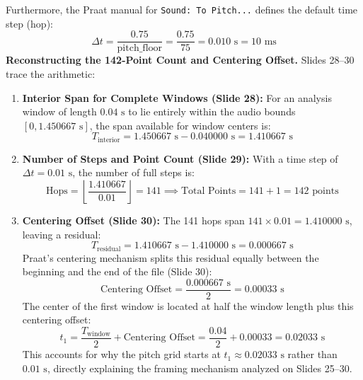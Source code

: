 \documentclass[11pt,a4paper]{article}
\begin{document}
Furthermore, the Praat manual for \texttt{Sound: To Pitch...} defines the default time step (hop):
\begin{equation}
\Delta t = \frac{0.75}{\text{pitch\_floor}} = \frac{0.75}{75} = 0.010\text{ s} = 10\text{ ms}
\end{equation}
\textbf{Reconstructing the 142-Point Count and Centering Offset.} Slides 28--30 trace the arithmetic:
\begin{enumerate}
    \item \textbf{Interior Span for Complete Windows (Slide 28):} For an analysis window of length $0.04\text{ s}$ to lie entirely within the audio bounds $[0, 1.450667\text{ s}]$, the span available for window centers is:
    \begin{equation}
    T_{\text{interior}} = 1.450667\text{ s} - 0.040000\text{ s} = 1.410667\text{ s}
    \end{equation}
    \item \textbf{Number of Steps and Point Count (Slide 29):} With a time step of $\Delta t = 0.01\text{ s}$, the number of full steps is:
    \begin{equation}
    \text{Hops} = \left\lfloor \frac{1.410667}{0.01} \right\rfloor = 141 \implies \text{Total Points} = 141 + 1 = 142\text{ points}
    \end{equation}
    \item \textbf{Centering Offset (Slide 30):} The 141 hops span $141 \times 0.01 = 1.410000\text{ s}$, leaving a residual:
    \begin{equation}
    T_{\text{residual}} = 1.410667\text{ s} - 1.410000\text{ s} = 0.000667\text{ s}
    \end{equation}
    Praat's centering mechanism splits this residual equally between the beginning and the end of the file (Slide 30):
    \begin{equation}
    \text{Centering Offset} = \frac{0.000667\text{ s}}{2} = 0.00033\text{ s}
    \end{equation}
    The center of the first window is located at half the window length plus this centering offset:
    \begin{equation}
    t_1 = \frac{T_{\text{window}}}{2} + \text{Centering Offset} = \frac{0.04}{2} + 0.00033 = 0.02033\text{ s}
    \end{equation}
    This accounts for why the pitch grid starts at $t_1 \approx 0.02033\text{ s}$ rather than $0.01\text{ s}$, directly explaining the framing mechanism analyzed on Slides 25--30.
\end{enumerate}
\end{document}
